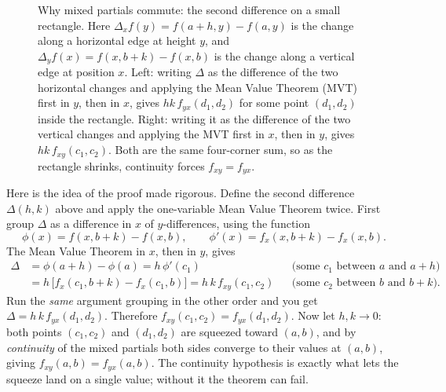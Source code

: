 \begin{figure}[H]
\caption{Why mixed partials commute: the second difference on a small rectangle. Here
$\Delta_x f(y) = f(a+h,y)-f(a,y)$ is the change along a horizontal edge at height $y$, and
$\Delta_y f(x) = f(x,b+k)-f(x,b)$ is the change along a vertical edge at position $x$.
Left: writing $\Delta$ as the difference of the two horizontal changes and applying the Mean
Value Theorem (MVT) first in $y$, then in $x$, gives $hk\,f_{yx}(d_1,d_2)$ for some point
$(d_1,d_2)$ inside the rectangle. Right: writing it as the difference of the two vertical
changes and applying the MVT first in $x$, then in $y$, gives $hk\,f_{xy}(c_1,c_2)$. Both are
the same four-corner sum, so as the rectangle shrinks, continuity forces $f_{xy}=f_{yx}$.}
\label{ch32:fig-clairaut-grid}
\end{figure}

\begin{whybox}
Here is the idea of the proof made rigorous. Define the second difference $\Delta(h,k)$ above
and apply the one-variable Mean Value Theorem twice. First group $\Delta$ as a difference in
$x$ of $y$-differences, using the function
\[
   \phi(x)=f(x,b+k)-f(x,b), \qquad \phi'(x)=f_x(x,b+k)-f_x(x,b).
\]
The Mean Value Theorem in $x$, then in $y$, gives
\begin{align*}
   \Delta &= \phi(a+h)-\phi(a) = h\,\phi'(c_1)
      && \text{(some $c_1$ between $a$ and $a+h$)}\\
   &= h\,\big[f_x(c_1,b+k)-f_x(c_1,b)\big] = h\,k\,f_{xy}(c_1,c_2)
      && \text{(some $c_2$ between $b$ and $b+k$).}
\end{align*}
Run the \emph{same} argument grouping in the other
order and you get $\Delta = h\,k\,f_{yx}(d_1,d_2)$. Therefore
$f_{xy}(c_1,c_2) = f_{yx}(d_1,d_2)$. Now let $h,k\to 0$: both points $(c_1,c_2)$ and
$(d_1,d_2)$ are squeezed toward $(a,b)$, and by \emph{continuity} of the mixed partials both
sides converge to their values at $(a,b)$, giving $f_{xy}(a,b)=f_{yx}(a,b)$. The continuity
hypothesis is exactly what lets the squeeze land on a single value; without it the theorem can
fail.
\end{whybox}

